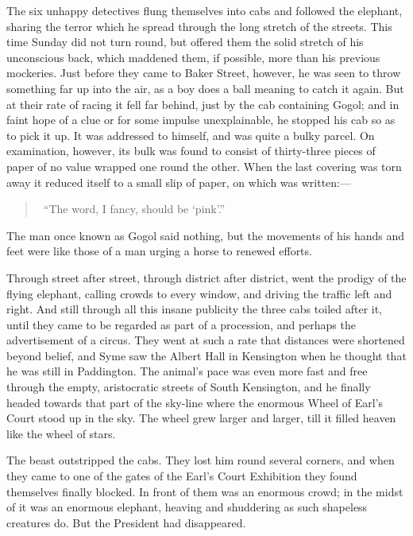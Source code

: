 \documentclass{book}
\begin{document}
The six unhappy detectives flung themselves into cabs and followed the elephant, sharing the terror which he spread through the long stretch of the streets. This time Sunday did not turn round, but offered them the solid stretch of his unconscious back, which maddened them, if possible, more than his previous mockeries. Just before they came to Baker Street, however, he was seen to throw something far up into the air, as a boy does a ball meaning to catch it again. But at their rate of racing it fell far behind, just by the cab containing Gogol; and in faint hope of a clue or for some impulse unexplainable, he stopped his cab so as to pick it up. It was addressed to himself, and was quite a bulky parcel. On examination, however, its bulk was found to consist of thirty-three pieces of paper of no value wrapped one round the other. When the last covering was torn away it reduced itself to a small slip of paper, on which was written:—

\begin{quotation}\
	“The word, I fancy, should be ‘pink’.”
\end{quotation}

The man once known as Gogol said nothing, but the movements of his hands and feet were like those of a man urging a horse to renewed efforts.

Through street after street, through district after district, went the prodigy of the flying elephant, calling crowds to every window, and driving the traffic left and right. And still through all this insane publicity the three cabs toiled after it, until they came to be regarded as part of a procession, and perhaps the advertisement of a circus. They went at such a rate that distances were shortened beyond belief, and Syme saw the Albert Hall in Kensington when he thought that he was still in Paddington. The animal’s pace was even more fast and free through the empty, aristocratic streets of South Kensington, and he finally headed towards that part of the sky-line where the enormous Wheel of Earl’s Court stood up in the sky. The wheel grew larger and larger, till it filled heaven like the wheel of stars.

The beast outstripped the cabs. They lost him round several corners, and when they came to one of the gates of the Earl’s Court Exhibition they found themselves finally blocked. In front of them was an enormous crowd; in the midst of it was an enormous elephant, heaving and shuddering as such shapeless creatures do. But the President had disappeared.
\end{document}
